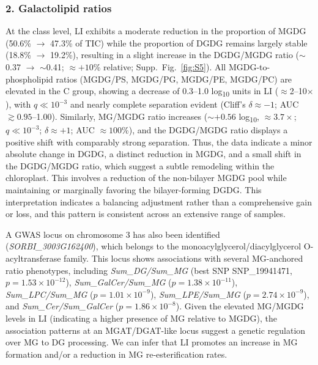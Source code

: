 \documentclass[10pt,letterpaper]{article}
\begin{document}
\begin{itemize}
\subsubsection*{2. Galactolipid ratios} 
At the class level, LI exhibits a moderate reduction in the proportion of MGDG (50.6\% $\rightarrow$ 47.3\% of TIC) while the proportion of DGDG remains largely stable (18.8\% $\rightarrow$ 19.2\%), resulting in a slight increase in the DGDG/MGDG ratio ($\sim$0.37 $\rightarrow$ $\sim$0.41; $\approx +10$\% relative; Supp.~Fig.~\ref{fig:S5}). All MGDG-to-phospholipid ratios (MGDG/PS, MGDG/PG, MGDG/PE, MGDG/PC) are elevated in the C group, showing a decrease of 0.3–1.0 log\textsubscript{10} units in LI ($\approx$2–10$\times$), with $q \ll 10^{-3}$ and nearly complete separation evident (Cliff’s $\delta \approx -1$; AUC $\gtrsim 0.95$–1.00). Similarly, MG/MGDG ratio increases ($\sim+0.56$ log\textsubscript{10}, $\approx 3.7\times$; $q \ll 10^{-3}$; $\delta \approx +1$; AUC $\approx 100$\%), and the DGDG/MGDG ratio displays a positive shift with comparably strong separation. Thus, the data indicate a minor absolute change in DGDG, a distinct reduction in MGDG, and a small shift in the DGDG/MGDG ratio, which suggest a subtle remodeling within the chloroplast. This involves a reduction of the non-bilayer MGDG pool while maintaining or marginally favoring the bilayer-forming DGDG. This interpretation indicates a balancing adjustment rather than a comprehensive gain or loss, and this pattern is consistent across an extensive range of samples.

A GWAS locus on chromosome 3 has also been identified (\textit{SORBI\_3003G162400}), which belongs to the monoacylglycerol/diacylglycerol O-acyltransferase family. This locus shows associations with several MG-anchored ratio phenotypes, including \textit{Sum\_DG/Sum\_MG} (best SNP SNP\_19941471, $p = 1.53 \times 10^{-12}$), \textit{Sum\_GalCer/Sum\_MG} ($p = 1.38 \times 10^{-11}$), \textit{Sum\_LPC/Sum\_MG} ($p = 1.01 \times 10^{-9}$), \textit{Sum\_LPE/Sum\_MG} ($p = 2.74 \times 10^{-9}$), and \textit{Sum\_Cer/Sum\_GalCer} ($p = 1.86 \times 10^{-8}$). Given the elevated MG/MGDG levels in LI (indicating a higher presence of MG relative to MGDG), the association patterns at an MGAT/DGAT-like locus suggest a genetic regulation over MG to DG processing. We can infer that LI promotes an increase in MG formation and/or a reduction in MG re-esterification rates. 


\end{itemize}
\end{document}
